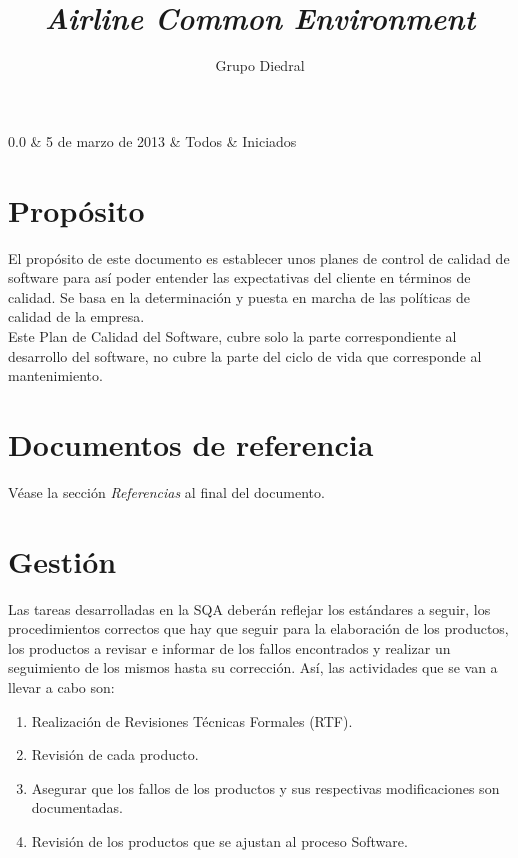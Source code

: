 \documentclass[11pt, a4paper, twoside, titlepage]{article}
\title{\doctitle\\\textsl{Airline Common Environment}}
\author{Grupo Diedral}
\newcommand*{\doctitle}{Plan de calidad}
\begin{document}
	\begin{tablacambios}
		0.0 & 5 de marzo de 2013 & Todos & Iniciados
	\end{tablacambios}


	\portadaace{\doctitle}{2.0}

	\tableofcontents
	\newpage

	\iniciarnumeraciondiedral
		
	\section{Propósito}	%
		El propósito de este documento es establecer unos planes de control de calidad de software para así poder entender las expectativas del cliente en términos de calidad. Se basa en la determinación y puesta en marcha de las políticas de calidad de la empresa. \\
		Este Plan de Calidad del Software, cubre solo la parte correspondiente al desarrollo del software, no cubre la parte del ciclo de vida que corresponde al mantenimiento.
		
	\section{Documentos de referencia}
		\nocite{IEEE730-2002}
		\nocite{IEEE1028-1997}
		\nocite{IEEE1058-1998}
		\nocite{IEEE1012-1998}
		\nocite{PSMAN}

		Véase la sección {\itshape Referencias} al final del documento.

	\section{Gestión} %
		Las tareas desarrolladas en la SQA deberán reflejar los estándares a seguir, los procedimientos correctos que hay que seguir para la elaboración de los productos, los productos a revisar e informar de los fallos encontrados y realizar un seguimiento de los mismos hasta su corrección. Así, las actividades que se van a llevar a cabo son: \\

			\begin{enumerate}
				\item Realización de Revisiones Técnicas Formales (RTF).
				\item Revisión de cada producto.
				\item Asegurar que los fallos de los productos y sus respectivas modificaciones son documentadas.
				\item Revisión de los productos que se ajustan al proceso Software.
			\end{enumerate}
\end{document}
